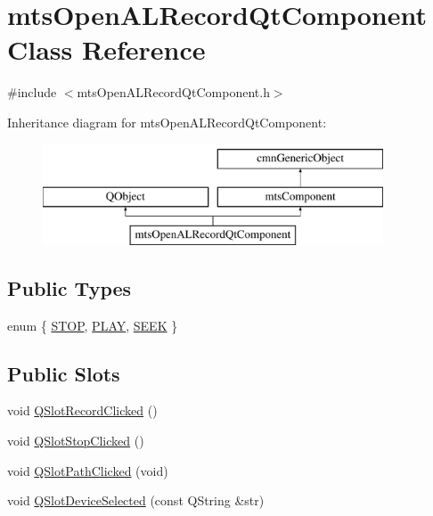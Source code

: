 \hypertarget{classmts_open_a_l_record_qt_component}{}\section{mts\+Open\+A\+L\+Record\+Qt\+Component Class Reference}
\label{classmts_open_a_l_record_qt_component}


{\ttfamily \#include $<$mts\+Open\+A\+L\+Record\+Qt\+Component.\+h$>$}

Inheritance diagram for mts\+Open\+A\+L\+Record\+Qt\+Component\+:\begin{figure}[H]
\begin{center}
\leavevmode
\includegraphics[height=3.000000cm]{df/d6e/classmts_open_a_l_record_qt_component}
\end{center}
\end{figure}
\subsection*{Public Types}
\begin{DoxyCompactItemize}
\item 
enum \{ \hyperlink{classmts_open_a_l_record_qt_component_a17b7c07e4c39feb29f6e0a68f65e5395a99e61abeea3225d5e94838d7a4cbaec0}{S\+T\+O\+P}, 
\hyperlink{classmts_open_a_l_record_qt_component_a17b7c07e4c39feb29f6e0a68f65e5395a9df9a56914ab643a6090f45bf69ae4de}{P\+L\+A\+Y}, 
\hyperlink{classmts_open_a_l_record_qt_component_a17b7c07e4c39feb29f6e0a68f65e5395af560d9d300c83662810c23ed8d2ee157}{S\+E\+E\+K}
 \}
\end{DoxyCompactItemize}
\subsection*{Public Slots}
\begin{DoxyCompactItemize}
\item 
void \hyperlink{classmts_open_a_l_record_qt_component_a9448468a4757b06d8dfc64d9d4bc1b10}{Q\+Slot\+Record\+Clicked} ()
\item 
void \hyperlink{classmts_open_a_l_record_qt_component_a1552a618032b23f9f8bb62ff88900cca}{Q\+Slot\+Stop\+Clicked} ()
\item 
void \hyperlink{classmts_open_a_l_record_qt_component_a89b972bc566a4b77be2da755af094f28}{Q\+Slot\+Path\+Clicked} (void)
\item 
void \hyperlink{classmts_open_a_l_record_qt_component_a1bcae70d87259df76c38aedefc443fbf}{Q\+Slot\+Device\+Selected} (const Q\+String \&str)
\end{DoxyCompactItemize}
